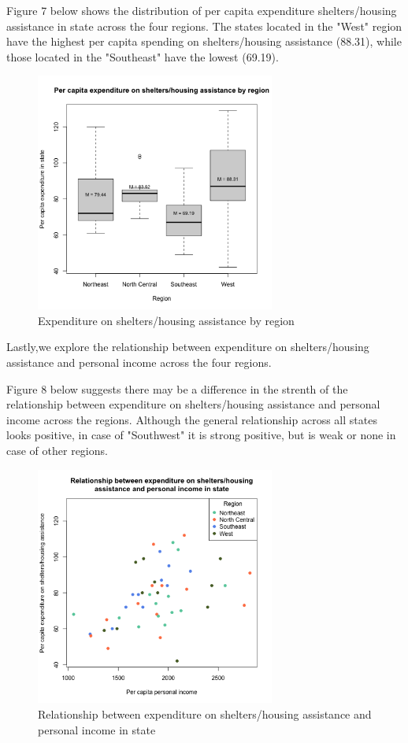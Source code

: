 \documentclass[12pt,letterpaper]{article}
\begin{document}
 
\vspace{.2cm}

\noindent Figure 7 below shows the distribution of per capita expenditure shelters/housing assistance in state across the four regions. The states located in the "West" region have the highest per capita spending on shelters/housing assistance (88.31), while those located in the "Southeast" have the lowest (69.19). 
\pagebreak

\begin{figure}[h!]\centering
	\caption{\footnotesize Expenditure on shelters/housing assistance by region}
	\label{fig:plot_7}
	\includegraphics[width=0.7\textwidth]{boxplot_y_r.png}
\end{figure}

\noindent Lastly,we explore the relationship between expenditure on shelters/housing assistance and personal income across the four regions.\\

 
\pagebreak

\noindent Figure 8 below suggests there may be a difference in the strenth of the relationship between expenditure on shelters/housing assistance and personal income across the regions. Although the general relationship across all states looks positive, in case of "Southwest" it is strong positive, but is weak or none in case of other regions. 

\begin{figure}[h!]\centering
	\caption{\footnotesize Relationship between expenditure on shelters/housing assistance and personal income in state}
	\label{fig:plot_8}
	\includegraphics[width=0.7\textwidth]{scatterplot_y_x1_r.png}
\end{figure}
\end{document}
